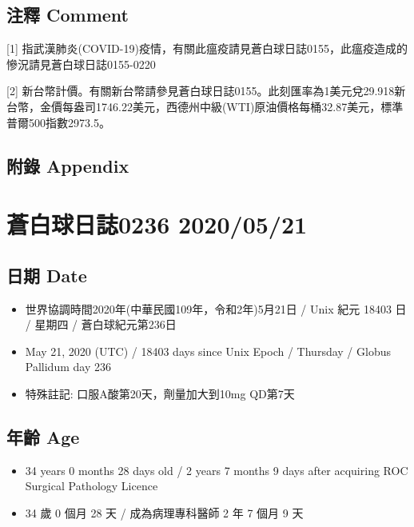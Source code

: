 \documentclass[a5paper, 11pt
]{book}
\providecommand{\tightlist}{%
  \setlength{\itemsep}{0pt}\setlength{\parskip}{0pt}}
\begin{document}
\hypertarget{ux6ce8ux91cb-comment-80}{%
\subsection{注釋 Comment}\label{ux6ce8ux91cb-comment-80}}

{[}1{]}
指武漢肺炎(COVID-19)疫情，有關此瘟疫請見蒼白球日誌0155，此瘟疫造成的慘況請見蒼白球日誌0155-0220

{[}2{]}
新台幣計價。有關新台幣請參見蒼白球日誌0155。此刻匯率為1美元兌29.918新台幣，金價每盎司1746.22美元，西德州中級(WTI)原油價格每桶32.87美元，標準普爾500指數2973.5。

\hypertarget{ux9644ux9304-appendix-80}{%
\subsection{附錄 Appendix}\label{ux9644ux9304-appendix-80}}

\hypertarget{ux84bcux767dux7403ux65e5ux8a8c0236-20200521}{%
\section{蒼白球日誌0236
2020/05/21}\label{ux84bcux767dux7403ux65e5ux8a8c0236-20200521}}

\hypertarget{ux65e5ux671f-date-81}{%
\subsection{日期 Date}\label{ux65e5ux671f-date-81}}

\begin{itemize}
\tightlist
\item
  世界協調時間2020年(中華民國109年，令和2年)5月21日 / Unix 紀元 18403 日
  / 星期四 / 蒼白球紀元第236日
\item
  May 21, 2020 (UTC) / 18403 days since Unix Epoch / Thursday / Globus
  Pallidum day 236
\item
  特殊註記: 口服A酸第20天，劑量加大到10mg QD第7天
\end{itemize}

\hypertarget{ux5e74ux9f61-age-81}{%
\subsection{年齡 Age}\label{ux5e74ux9f61-age-81}}

\begin{itemize}
\tightlist
\item
  34 years 0 months 28 days old / 2 years 7 months 9 days after
  acquiring ROC Surgical Pathology Licence
\item
  34 歲 0 個月 28 天 / 成為病理專科醫師 2 年 7 個月 9 天
\end{itemize}
\end{document}
